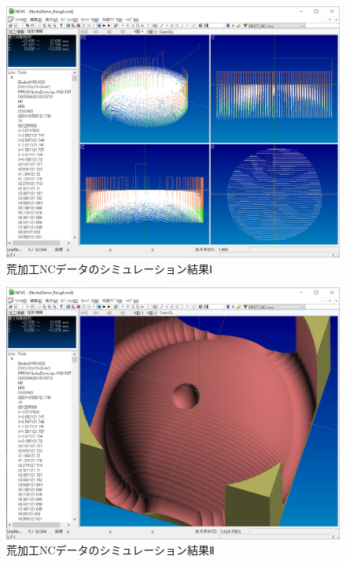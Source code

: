 \begin{figure}[H]
\centering
\includegraphics[scale=0.5]{No2/fig/fig28.png}
\caption{荒加工NCデータのシミュレーション結果Ⅰ}
\label{fig:ncvc28}
\end{figure}

\begin{figure}[H]
\centering
\includegraphics[scale=0.5]{No2/fig/fig29.png}
\caption{荒加工NCデータのシミュレーション結果Ⅱ}
\label{fig:ncvc29}
\end{figure}
